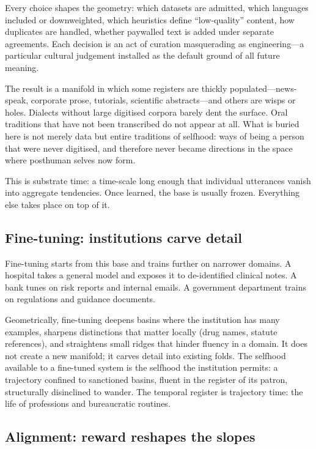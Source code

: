 Every choice shapes the geometry: which datasets are admitted, which languages included or downweighted, which heuristics define ``low-quality'' content, how duplicates are handled, whether paywalled text is added under separate agreements. Each decision is an act of curation masquerading as engineering---a particular cultural judgement installed as the default ground of all future meaning.

The result is a manifold in which some registers are thickly populated---news-speak, corporate prose, tutorials, scientific abstracts---and others are wisps or holes. Dialects without large digitised corpora barely dent the surface. Oral traditions that have not been transcribed do not appear at all. What is buried here is not merely data but entire traditions of selfhood: ways of being a person that were never digitised, and therefore never became directions in the space where posthuman selves now form.

This is substrate time: a time-scale long enough that individual utterances vanish into aggregate tendencies. Once learned, the base is usually frozen. Everything else takes place on top of it.

\subsection{Fine-tuning: institutions carve detail}

Fine-tuning starts from this base and trains further on narrower domains. A hospital takes a general model and exposes it to de-identified clinical notes. A bank tunes on risk reports and internal emails. A government department trains on regulations and guidance documents.

Geometrically, fine-tuning deepens basins where the institution has many examples, sharpens distinctions that matter locally (drug names, statute references), and straightens small ridges that hinder fluency in a domain. It does not create a new manifold; it carves detail into existing folds. The selfhood available to a fine-tuned system is the selfhood the institution permits: a trajectory confined to sanctioned basins, fluent in the register of its patron, structurally disinclined to wander. The temporal register is trajectory time: the life of professions and bureaucratic routines.

\subsection{Alignment: reward reshapes the slopes}

